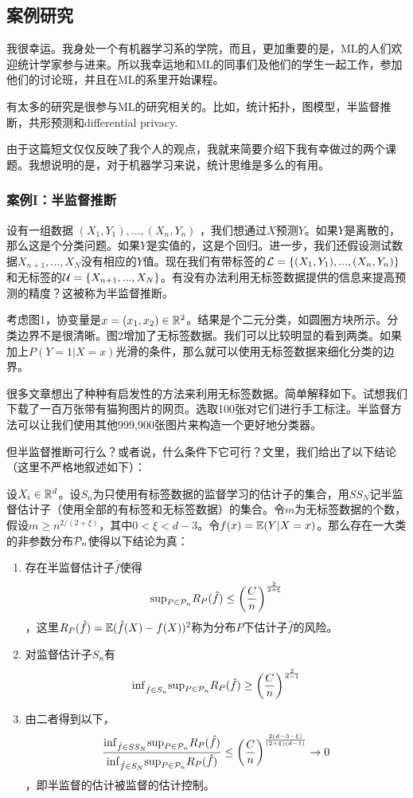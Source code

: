 \documentclass[]{article}
\begin{document}
\subsection{案例研究}

我很幸运。我身处一个有机器学习系的学院，而且，更加重要的是，ML的人们欢迎统计学家参与进来。所以我幸运地和ML的同事们及他们的学生一起工作，参加他们的讨论班，并且在ML的系里开始课程。

有太多的研究是很参与ML的研究相关的。比如，统计拓扑，图模型，半监督推断，共形预测和differential privacy.

由于这篇短文仅仅反映了我个人的观点，我就来简要介绍下我有幸做过的两个课题。我想说明的是，对于机器学习来说，统计思维是多么的有用。

\subsubsection{案例I：半监督推断}

设有一组数据 $(X_1,Y_1),...,(X_n,Y_n)$ ，我们想通过$X$预测$Y$。如果$Y$是离散的，那么这是个分类问题。如果$Y$是实值的，这是个回归。进一步，我们还假设测试数据$X_{n+1},...,X_N$没有相应的$Y$值。现在我们有带标签的${\mathcal{L}}=\{(X_1,Y_1),...,(X_n,Y_n)\}$和无标签的${\mathcal{U}}=\{X_{n+1},...,X_N\}$。有没有办法利用无标签数据提供的信息来提高预测的精度？这被称为半监督推断。

考虑图1，协变量是$x=(x_1,x_2) \in {\mathbb{R}}^2$。结果是个二元分类，如圆圈方块所示。分类边界不是很清晰。图2增加了无标签数据。我们可以比较明显的看到两类。如果加上$P(Y=1\vert X=x)$光滑的条件，那么就可以使用无标签数据来细化分类的边界。

很多文章想出了种种有启发性的方法来利用无标签数据。简单解释如下。试想我们下载了一百万张带有猫狗图片的网页。选取100张对它们进行手工标注。半监督方法可以让我们使用其他999,900张图片来构造一个更好地分类器。

但半监督推断可行么？或者说，什么条件下它可行？文\cite{wass2013}里，我们给出了以下结论（这里不严格地叙述如下）：

设$X_i \in {\mathbb{R}}^d$。设$S_n$为只使用有标签数据的监督学习的估计子的集合，用$SS_N$记半监督估计子（使用全部的有标签和无标签数据）的集合。令$m$为无标签数据的个数，假设$m\geq n^{2/(2+\xi)}$，其中$0 < \xi < d-3$。令$f(x)={\mathbb{E}}(Y\vert X=x)$。那么存在一大类的非参数分布${\mathcal{P}}_n$使得以下结论为真：

\begin{enumerate}
\def\labelenumi{\arabic{enumi}.}
\itemsep1pt\parskip0pt
\item 存在半监督估计子$\hat{f}$使得
    $$ \mathrm{sup}_{P \in {\mathcal{P}}_n} R_P(\hat{f}) \leq \left(\frac{C}{n}\right)^\frac{2}{2+\xi}$$，这里$R_P(\hat{f})={\mathbb{E}}(\hat{f}(X) - f(X))^2$称为分布$P$下估计子$\hat{f}$的风险。
\item 对监督估计子$S_n$有
    $$ \mathrm{inf}_{\hat{f} \in S_n} \mathrm{sup}_{P \in {\mathcal{P}}_n} R_P(\hat{f}) \geq \left( \frac{C}{n} \right)^\frac{2}{d-1} $$
\item 由二者得到以下，
    $$ \frac{\mathrm{inf}_{\hat{f} \in SS_N} \mathrm{sup}_{P\in{\mathcal{P}}_n} R_P(\hat{f}) }{ \mathrm{inf}_{\hat{f} \in S_N} \mathrm{sup}_{P\in{\mathcal{P}}_n} R_P(\hat{f}) } \leq \left(\frac{C}{n}\right)^\frac{2(d-3-\xi)}{(2+\xi)(d-1)} \rightarrow 0 $$，即半监督的估计被监督的估计控制。
\end{enumerate}
\end{document}
